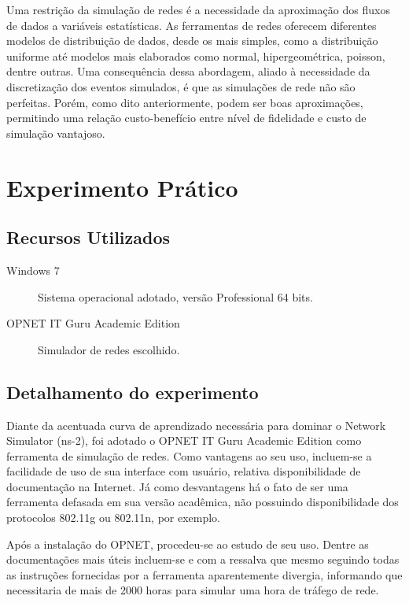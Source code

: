 \documentclass[brazil,times,12pt]{abnt}
\begin{document}
Uma restrição da simulação de redes é a necessidade da aproximação dos fluxos de
dados a variáveis estatísticas. As ferramentas de redes oferecem diferentes
modelos de distribuição de dados, desde os mais simples, como a distribuição
uniforme até modelos mais elaborados como normal, hipergeométrica, poisson,
dentre outras. Uma consequência dessa abordagem, aliado à necessidade da
discretização dos eventos simulados, é que as simulações de rede não são
perfeitas. Porém, como dito anteriormente, podem ser boas aproximações,
permitindo uma relação custo-benefício entre nível de fidelidade e custo de
simulação vantajoso. \cite{hughes:network-simulation-introduction}

\section*{Experimento Prático}
\subsection*{Recursos Utilizados}
\begin{description}
  \item[Windows 7] Sistema operacional adotado, versão Professional 64 bits.
  \item[OPNET IT Guru Academic Edition] Simulador de redes escolhido.
\end{description}

\subsection*{Detalhamento do experimento}
Diante da acentuada curva de aprendizado necessária para dominar o
Network Simulator (ns-2), foi adotado o OPNET IT Guru Academic Edition como
ferramenta de simulação de redes. Como vantagens ao seu uso, incluem-se a
facilidade de uso de sua interface com usuário, relativa disponibilidade de
documentação na Internet. Já como desvantagens há o fato de ser uma ferramenta
defasada em sua versão acadêmica, não possuindo disponibilidade dos protocolos
802.11g ou 802.11n, por exemplo.

Após a instalação do OPNET, procedeu-se ao estudo de seu uso. Dentre as
documentações mais úteis incluem-se \cite{opnet:small-network} e
\cite{siddique:wlan-opnet-tutorial} com a ressalva que mesmo seguindo todas as
instruções fornecidas por \cite{siddique:wlan-opnet-tutorial} a ferramenta
aparentemente divergia, informando que necessitaria de mais de 2000 horas para
simular uma hora de tráfego de rede.
\end{document}
